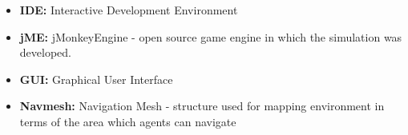 \begin{itemize}
\item{\textbf{IDE:} Interactive Development Environment}
\item{\textbf{jME:} jMonkeyEngine - open source game engine in which the simulation was developed.}
\item{\textbf{GUI:} Graphical User Interface}
\item{\textbf{Navmesh:} Navigation Mesh - structure used for mapping environment in terms of the area which agents can navigate}
\end{itemize}

